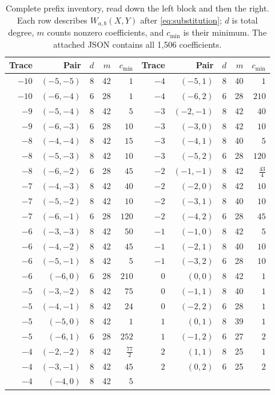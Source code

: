 \begin{table}[htbp]
\centering
\caption{Complete prefix inventory, read down the left block and then the right.
Each row describes $W_{a,b}(X,Y)$ after \eqref{eq:substitution}; $d$ is total degree,
$m$ counts nonzero coefficients, and $c_{\min}$ is their minimum. The attached
JSON contains all 1,506 coefficients.}\label{tab:prefixes}
\small\setlength{\tabcolsep}{5pt}
\begin{tabular}{rrrrr@{\hspace{2em}}rrrrr}
\toprule
Trace & Pair & $d$ & $m$ & $c_{\min}$ & Trace & Pair & $d$ & $m$ & $c_{\min}$\\
\midrule
$-10$ & $(-5,-5)$ & 8 & 42 & $1$ & $-4$ & $(-5,1)$ & 8 & 40 & $1$ \\
$-10$ & $(-6,-4)$ & 6 & 28 & $1$ & $-4$ & $(-6,2)$ & 6 & 28 & $210$ \\
$-9$ & $(-5,-4)$ & 8 & 42 & $5$ & $-3$ & $(-2,-1)$ & 8 & 42 & $40$ \\
$-9$ & $(-6,-3)$ & 6 & 28 & $10$ & $-3$ & $(-3,0)$ & 8 & 42 & $10$ \\
$-8$ & $(-4,-4)$ & 8 & 42 & $15$ & $-3$ & $(-4,1)$ & 8 & 40 & $5$ \\
$-8$ & $(-5,-3)$ & 8 & 42 & $10$ & $-3$ & $(-5,2)$ & 6 & 28 & $120$ \\
$-8$ & $(-6,-2)$ & 6 & 28 & $45$ & $-2$ & $(-1,-1)$ & 8 & 42 & $\tfrac{43}{4}$ \\
$-7$ & $(-4,-3)$ & 8 & 42 & $40$ & $-2$ & $(-2,0)$ & 8 & 42 & $10$ \\
$-7$ & $(-5,-2)$ & 8 & 42 & $10$ & $-2$ & $(-3,1)$ & 8 & 40 & $10$ \\
$-7$ & $(-6,-1)$ & 6 & 28 & $120$ & $-2$ & $(-4,2)$ & 6 & 28 & $45$ \\
$-6$ & $(-3,-3)$ & 8 & 42 & $50$ & $-1$ & $(-1,0)$ & 8 & 42 & $5$ \\
$-6$ & $(-4,-2)$ & 8 & 42 & $45$ & $-1$ & $(-2,1)$ & 8 & 40 & $10$ \\
$-6$ & $(-5,-1)$ & 8 & 42 & $5$ & $-1$ & $(-3,2)$ & 6 & 28 & $10$ \\
$-6$ & $(-6,0)$ & 6 & 28 & $210$ & $0$ & $(0,0)$ & 8 & 42 & $1$ \\
$-5$ & $(-3,-2)$ & 8 & 42 & $75$ & $0$ & $(-1,1)$ & 8 & 40 & $1$ \\
$-5$ & $(-4,-1)$ & 8 & 42 & $24$ & $0$ & $(-2,2)$ & 6 & 28 & $1$ \\
$-5$ & $(-5,0)$ & 8 & 42 & $1$ & $1$ & $(0,1)$ & 8 & 39 & $1$ \\
$-5$ & $(-6,1)$ & 6 & 28 & $252$ & $1$ & $(-1,2)$ & 6 & 27 & $2$ \\
$-4$ & $(-2,-2)$ & 8 & 42 & $\tfrac{77}{2}$ & $2$ & $(1,1)$ & 8 & 25 & $1$ \\
$-4$ & $(-3,-1)$ & 8 & 42 & $45$ & $2$ & $(0,2)$ & 6 & 25 & $2$ \\
$-4$ & $(-4,0)$ & 8 & 42 & $5$ &  & & & &  \\
\bottomrule
\end{tabular}
\end{table}
